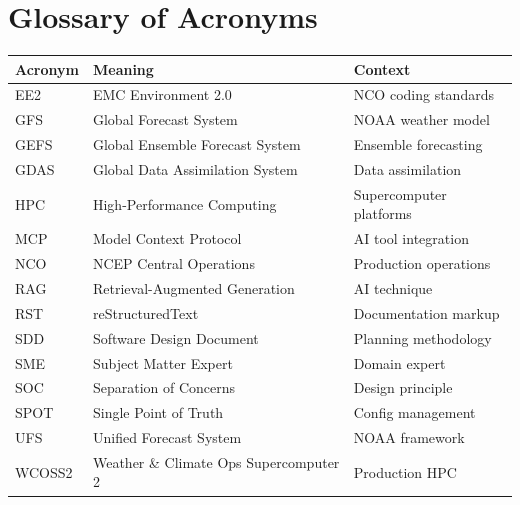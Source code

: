 \documentclass[11pt,letterpaper]{article}
\begin{document}
\appendix
\section{Glossary of Acronyms}

\begin{longtable}{@{}lll@{}}
\toprule
\textbf{Acronym} & \textbf{Meaning} & \textbf{Context} \\
\midrule
\endhead
EE2 & EMC Environment 2.0 & NCO coding standards \\
GFS & Global Forecast System & NOAA weather model \\
GEFS & Global Ensemble Forecast System & Ensemble forecasting \\
GDAS & Global Data Assimilation System & Data assimilation \\
HPC & High-Performance Computing & Supercomputer platforms \\
MCP & Model Context Protocol & AI tool integration \\
NCO & NCEP Central Operations & Production operations \\
RAG & Retrieval-Augmented Generation & AI technique \\
RST & reStructuredText & Documentation markup \\
SDD & Software Design Document & Planning methodology \\
SME & Subject Matter Expert & Domain expert \\
SOC & Separation of Concerns & Design principle \\
SPOT & Single Point of Truth & Config management \\
UFS & Unified Forecast System & NOAA framework \\
WCOSS2 & Weather \& Climate Ops Supercomputer 2 & Production HPC \\
\bottomrule
\end{longtable}
\end{document}
